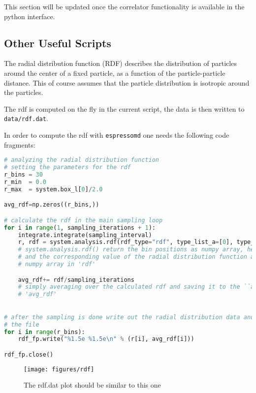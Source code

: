 \documentclass[
paper=a4,                       %
fontsize=11pt,                  %
twoside,                        %
footsepline,                    %
headsepline,                    %
headinclude=false,              %
footinclude=false,              %
pagesize,                       %
]{scrartcl}
\begin{document}
This section will be updated once the correlator functionality is available in the
python interface.

\subsection{Other Useful Scripts}
\label{subsection:other_useful_scripts}
The radial distribution function (RDF) describes the distribution of particles around
the center of a fixed particle, as a function of the particle-particle distance. This of course assumes
that the particle distribution is isotropic around the particles.

The rdf is computed on the fly in the current script, the data is then written to
\texttt{data/rdf.dat}.

In order to compute the rdf with \texttt{espressomd} one needs the following code
fragments:
\begin{lstlisting}[language=Python]
# analyzing the radial distribution function
# setting the parameters for the rdf
r_bins = 30
r_min  = 0.0
r_max  = system.box_l[0]/2.0

avg_rdf=np.zeros((r_bins,))

# calculate the rdf in the main sampling loop
for i in range(1, sampling_iterations + 1):
    integrate.integrate(sampling_interval)
    r, rdf = system.analysis.rdf(rdf_type="rdf", type_list_a=[0], type_list_b=[0], r_min=r_min, r_max=r_max, r_bins=r_bins)
    # system.analysis.rdf() return the bin positions as numpy array, here 'r'
    # and the corresponding value of the radial distribution function also as
    # numpy array in 'rdf'

    avg_rdf+= rdf/sampling_iterations
    # simply averaging over the calculated rdf and saving it to the ``average'' rdf
    # 'avg_rdf'
    

# after the sampling is done write out the radial distribution data and then close
# the file
for i in range(r_bins):
    rdf_fp.write("%1.5e %1.5e\n" % (r[i], avg_rdf[i]))

rdf_fp.close()
\end{lstlisting}

\begin{figure}[ht]
\begin{center}
\texttt{[image: figures/rdf]}
\label{fig:rdf}
\caption{The rdf.dat plot should be similar to this one}
\end{center}
\end{figure}
\end{document}
